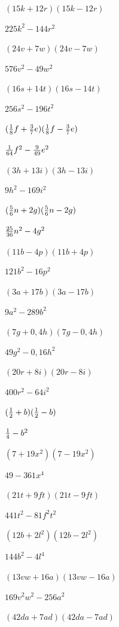 \documentclass[
  ngerman,
]{book}
\begin{document}
\((15k+12r)(15k-12r)\)

\leavevmode\hypertarget{toggleText52}{}%
\(225k^2-144r^2\)

\((24v+7w)(24v-7w)\)

\leavevmode\hypertarget{toggleText53}{}%
\(576v^2-49w^2\)

\((16s+14t)(16s-14t)\)

\leavevmode\hypertarget{toggleText54}{}%
\(256s^2-196t^2\)

\(({1 \over 8}f+{3\over 7}e)({1 \over 8}f-{3\over 7}e)\)

\leavevmode\hypertarget{toggleText55}{}%
\({1 \over 64}f^2-{9 \over 49}e^2\)

\((3h+13i)(3h-13i)\)

\leavevmode\hypertarget{toggleText56}{}%
\(9h^2-169i^2\)

\(({5 \over 6} n + 2g)({5 \over 6} n - 2g)\)

\leavevmode\hypertarget{toggleText57}{}%
\({25 \over 36} n^2 - 4g^2\)

\((11b-4p)(11b+4p)\)

\leavevmode\hypertarget{toggleText58}{}%
\(121b^2-16p^2\)

\((3a+17b)(3a-17b)\)

\leavevmode\hypertarget{toggleText59}{}%
\(9a^2-289b^2\)

\((7g+0,4h)(7g-0,4h)\)

\leavevmode\hypertarget{toggleText60}{}%
\(49g^2-0,16h^2\)

\((20r+8i)(20r-8i)\)

\leavevmode\hypertarget{toggleText61}{}%
\(400r^2-64i^2\)

\(({1 \over 2}+b)({1 \over 2}-b)\)

\leavevmode\hypertarget{toggleText62}{}%
\({1 \over 4}-b^2\)

\((7+19x^2)(7-19x^2)\)

\leavevmode\hypertarget{toggleText63}{}%
\(49-361x^4\)

\((21t+9ft)(21t-9ft)\)

\leavevmode\hypertarget{toggleText64}{}%
\(441t^2-81f^2t^2\)

\((12b+2l^2)(12b-2l^2)\)

\leavevmode\hypertarget{toggleText65}{}%
\(144b^2-4l^4\)

\((13vw+16a)(13vw-16a)\)

\leavevmode\hypertarget{toggleText66}{}%
\(169v^2w^2-256a^2\)

\((42da+7ad)(42da-7ad)\)
\end{document}
